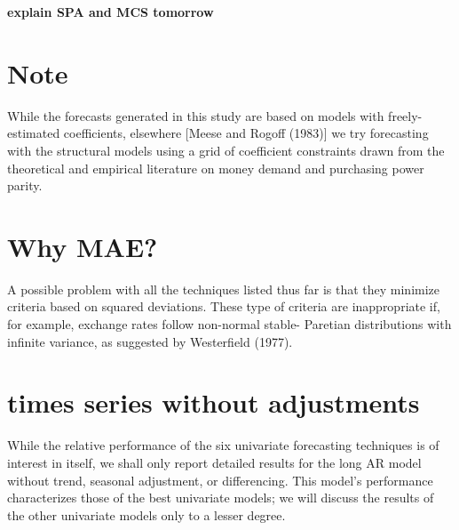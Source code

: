 \textbf{explain SPA and MCS tomorrow}


\section{Note}
While the forecasts generated in this study are based on models with
freely-estimated coefficients, elsewhere [Meese and Rogoff (1983)] we try
forecasting with the structural models using a grid of coefficient constraints
drawn from the theoretical and empirical literature on money demand and
purchasing power parity.

\section{Why MAE?}
A possible problem with all the techniques listed thus far is that they
minimize criteria based on squared deviations. These type of criteria are
inappropriate if, for example, exchange rates follow non-normal stable-
Paretian distributions with infinite variance, as suggested by Westerfield
(1977).

\section{times series without adjustments}
While the relative performance of the six univariate forecasting techniques
is of interest in itself, we shall only report detailed results for the long AR
model without trend, seasonal adjustment, or differencing. This model's
performance characterizes those of the best univariate models; we will discuss
the results of the other univariate models only to a lesser degree.